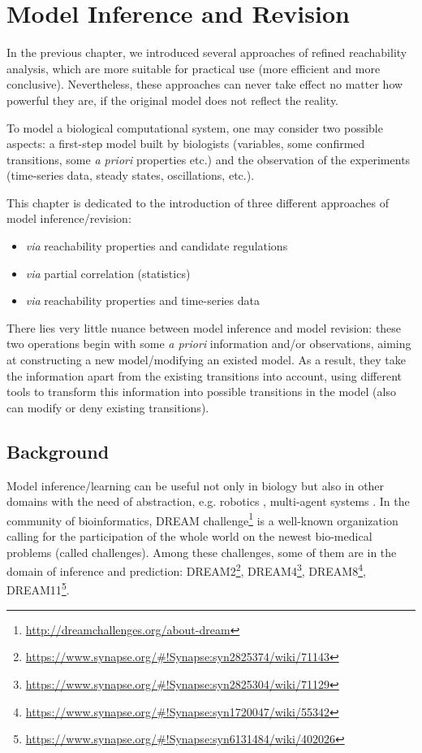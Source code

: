 \chapter{Model Inference and Revision}\label{chap:modelInference}
\begin{mybox}
In the previous chapter, we introduced several approaches of refined reachability analysis, which are more suitable for practical use (more efficient and more conclusive).
Nevertheless, these approaches can never take effect no matter how powerful they are, if the original model does not reflect the reality.

To model a biological computational system, one may consider two possible aspects: a first-step model built by biologists (variables, some confirmed transitions, some \textit{a priori} properties etc.) and the observation of the experiments (time-series data, steady states, oscillations, etc.).

This chapter is dedicated to the introduction of three different approaches of model inference/revision:

\begin{itemize}
    \item \textit{via} reachability properties and candidate regulations
    \item \textit{via} partial correlation (statistics)
    \item \textit{via} reachability properties and time-series data
\end{itemize}

There lies very little nuance between model inference and model revision: these two operations begin with some \textit{a priori} information and/or observations, aiming at constructing a new model/modifying an existed model.
As a result, they take the information apart from the existing transitions into account, using different tools to transform this information into possible transitions in the model (also can modify or deny existing transitions).

\end{mybox}

\section{Background}
Model inference/learning can be useful not only in biology \cite{ribeiro2015learning} but also in other domains with the need of abstraction, e.g. robotics \cite{nguyen2011model}, multi-agent systems \cite{foerster2016learning}.
In the community of bioinformatics, DREAM  challenge\footnote{\url{http://dreamchallenges.org/about-dream}} is a well-known organization calling for the participation of the whole world on the newest bio-medical problems (called challenges). 
Among these challenges, some of them are in the domain of inference and prediction:
DREAM2\footnote{\url{https://www.synapse.org/\#!Synapse:syn2825374/wiki/71143}},
DREAM4\footnote{\url{https://www.synapse.org/\#!Synapse:syn2825304/wiki/71129}},
DREAM8\footnote{\url{https://www.synapse.org/\#!Synapse:syn1720047/wiki/55342}},
DREAM11\footnote{\url{https://www.synapse.org/\#!Synapse:syn6131484/wiki/402026}}.

